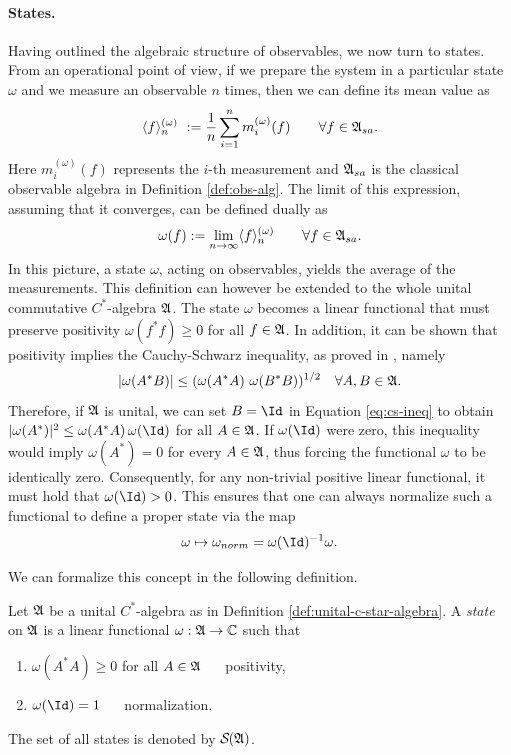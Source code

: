 	\paragraph{States.}
	Having outlined the algebraic structure of observables, we now turn to states. From an operational point of view, if we prepare the system in a particular state $\omega$ and we measure an observable $n$ times, then we can define its mean value as
	\[
	\langle f \rangle^{(\omega)}_n \ := \frac{1}{n}\sum_{i=1}^n m^{(\omega)}_i(f) \qquad \forall f \in \mathfrak{A}_{sa}.
	\]
	Here $m^{(\omega)}_i(f)$ represents the $i$-th measurement and $\mathfrak{A}_{sa}$ is the classical observable algebra in Definition \ref{def:obs-alg}. The limit of this expression, assuming that it converges, can be defined dually as
	\[
	\omega(f) := \lim_{n \to \infty} \langle f \rangle ^{(\omega)}_n \qquad \forall f \in \mathfrak{A}_{sa}.
	\]
	In this picture, a state $\omega$, acting on observables, yields the average of the measurements. This definition can however be extended to the whole unital commutative $C^*$-algebra $\mathfrak{A}$. The state $\omega$ becomes a linear functional that must preserve positivity $\omega(f^*f) \geq 0$ for all $f \in \mathfrak{A}$. In addition, it can be shown that positivity implies the Cauchy-Schwarz inequality, as proved in \cite[Lemma 2.3.10]{bratteliOperatorAlgebrasQuantum}, namely
	\begin{equation}
		|\omega(A^*B)| \leq (\omega(A^*A) \ \omega(B^*B))^{1/2} \quad \forall A,B \in \A.\label{eq:cs-ineq}
	\end{equation}
	Therefore, if $\mathfrak{A}$ is unital, we can set $B = \Id$ in Equation \eqref{eq:cs-ineq} to obtain $|\omega(A^*)|^2 \leq \omega(A^*A) \, \omega(\Id)$ for all $A \in \mathfrak{A}$. If $\omega(\Id)$ were zero, this inequality would imply $\omega(A^*) = 0$ for every $A \in \mathfrak{A}$, thus forcing the functional $\omega$ to be identically zero. Consequently, for any non-trivial positive linear functional, it must hold that $\omega(\Id) > 0$. This ensures that one can always normalize such a functional to define a proper state via the map $$\omega \mapsto \omega_{norm} = \omega(\Id)^{-1} \omega.$$
	
	\noindent We can formalize this concept in the following definition.
	
	\begin{definition}\label{def:state}
		Let $\mathfrak{A}$ be a unital $C^*$-algebra as in Definition \ref{def:unital-c-star-algebra}. A \emph{state} on $\mathfrak{A}$ is a linear functional $\omega:\mathfrak{A}\to\mathbb{C}$ such that
		\begin{enumerate}
			\item $\omega(A^*A)\ge 0$ for all $A\in\mathfrak{A}$ $\quad$ positivity,
			\item $\omega(\Id)=1$  $\quad$ normalization.
		\end{enumerate}
		The set of all states is denoted by $\mathcal{S}(\A)$.
	\end{definition}
	

